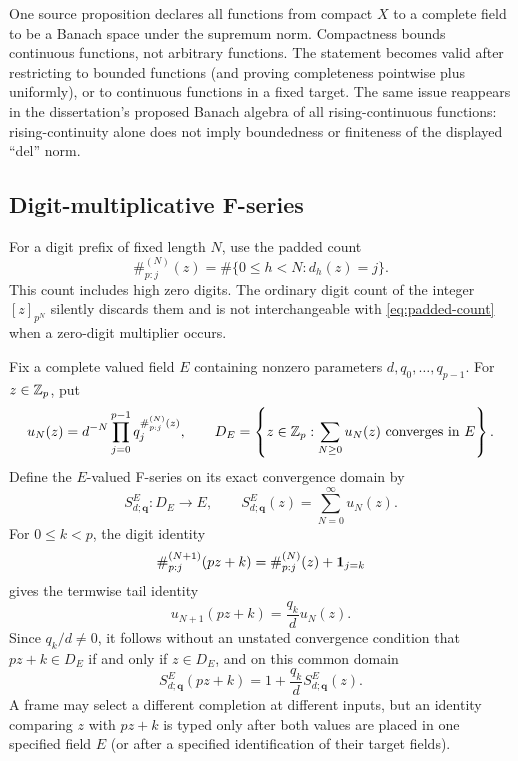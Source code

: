 \begin{sourceissue}
One source proposition declares all functions from compact $X$ to a complete
field to be a Banach space under the supremum norm.  Compactness bounds
continuous functions, not arbitrary functions.  The statement becomes
valid after restricting to bounded functions (and proving completeness
pointwise plus uniformly), or to continuous functions in a fixed target.
The same issue reappears in the dissertation's proposed Banach algebra of all
rising-continuous functions: rising-continuity alone does not imply
boundedness or finiteness of the displayed ``del'' norm.
\end{sourceissue}

\subsection{Digit-multiplicative F-series}

For a digit prefix of fixed length $N$, use the padded count
\begin{equation}
\label{eq:padded-count}
 \#^{(N)}_{p:j}(z)=\#\{0\leq h<N:d_h(z)=j\}.
\end{equation}
This count includes high zero digits.  The ordinary digit count of the
integer $[z]_{p^N}$ silently discards them and is not interchangeable with
\cref{eq:padded-count} when a zero-digit multiplier occurs.

Fix a complete valued field $E$ containing nonzero parameters
$d,q_0,\ldots,q_{p-1}$.  For $z\in\mathbb Z_p$, put
\[
 u_N(z)=d^{-N}\prod_{j=0}^{p-1}
 q_j^{\#^{(N)}_{p:j}(z)},
 \qquad
 D_E=\left\{z\in\mathbb Z_p:\sum_{N\geq0}u_N(z)
                       \text{ converges in }E\right\}.
\]
Define the $E$-valued F-series on its exact convergence domain by
\begin{equation}
\label{eq:general-F-series}
 S^E_{d;\mathbf q}:D_E\longrightarrow E,
 \qquad S^E_{d;\mathbf q}(z)=\sum_{N=0}^{\infty}u_N(z).
\end{equation}
 For $0\leq k<p$, the digit identity
\[
 \#^{(N+1)}_{p:j}(pz+k)
 =\#^{(N)}_{p:j}(z)+\mathbf 1_{j=k}
\]
gives the termwise tail identity
\[
 u_{N+1}(pz+k)=\frac{q_k}{d}u_N(z).
\]
Since $q_k/d\ne0$, it follows without an unstated convergence condition that
$pz+k\in D_E$ if and only if $z\in D_E$, and on this common domain
\begin{equation}
\label{eq:F-series-FE}
 S^E_{d;\mathbf q}(pz+k)=1+\frac{q_k}{d}S^E_{d;\mathbf q}(z).
\end{equation}
A frame may select a different completion at different inputs, but an
identity comparing $z$ with $pz+k$ is typed only after both values are placed
in one specified field $E$ (or after a specified identification of their
target fields).

